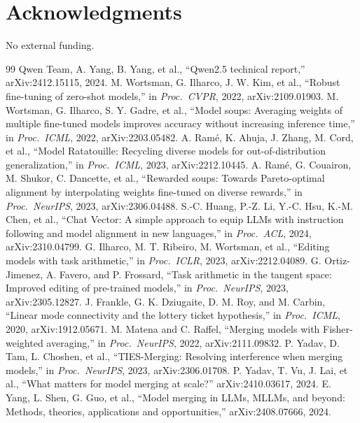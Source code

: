 \documentclass[conference]{IEEEtran}
\begin{document}
\section*{Acknowledgments}
No external funding.

\begin{thebibliography}{99}
 Qwen Team, A. Yang, B. Yang, et al., ``Qwen2.5 technical report,'' arXiv:2412.15115, 2024.
 M. Wortsman, G. Ilharco, J. W. Kim, et al., ``Robust fine-tuning of zero-shot models,'' in \emph{Proc.\ CVPR}, 2022, arXiv:2109.01903.
 M. Wortsman, G. Ilharco, S. Y. Gadre, et al., ``Model soups: Averaging weights of multiple fine-tuned models improves accuracy without increasing inference time,'' in \emph{Proc.\ ICML}, 2022, arXiv:2203.05482.
 A. Ram\'e, K. Ahuja, J. Zhang, M. Cord, et al., ``Model Ratatouille: Recycling diverse models for out-of-distribution generalization,'' in \emph{Proc.\ ICML}, 2023, arXiv:2212.10445.
 A. Ram\'e, G. Couairon, M. Shukor, C. Dancette, et al., ``Rewarded soups: Towards Pareto-optimal alignment by interpolating weights fine-tuned on diverse rewards,'' in \emph{Proc.\ NeurIPS}, 2023, arXiv:2306.04488.
 S.-C. Huang, P.-Z. Li, Y.-C. Hsu, K.-M. Chen, et al., ``Chat Vector: A simple approach to equip LLMs with instruction following and model alignment in new languages,'' in \emph{Proc.\ ACL}, 2024, arXiv:2310.04799.
 G. Ilharco, M. T. Ribeiro, M. Wortsman, et al., ``Editing models with task arithmetic,'' in \emph{Proc.\ ICLR}, 2023, arXiv:2212.04089.
 G. Ortiz-Jimenez, A. Favero, and P. Frossard, ``Task arithmetic in the tangent space: Improved editing of pre-trained models,'' in \emph{Proc.\ NeurIPS}, 2023, arXiv:2305.12827.
 J. Frankle, G. K. Dziugaite, D. M. Roy, and M. Carbin, ``Linear mode connectivity and the lottery ticket hypothesis,'' in \emph{Proc.\ ICML}, 2020, arXiv:1912.05671.
 M. Matena and C. Raffel, ``Merging models with Fisher-weighted averaging,'' in \emph{Proc.\ NeurIPS}, 2022, arXiv:2111.09832.
 P. Yadav, D. Tam, L. Choshen, et al., ``TIES-Merging: Resolving interference when merging models,'' in \emph{Proc.\ NeurIPS}, 2023, arXiv:2306.01708.
 P. Yadav, T. Vu, J. Lai, et al., ``What matters for model merging at scale?'' arXiv:2410.03617, 2024.
 E. Yang, L. Shen, G. Guo, et al., ``Model merging in LLMs, MLLMs, and beyond: Methods, theories, applications and opportunities,'' arXiv:2408.07666, 2024.

\end{thebibliography}
\end{document}
